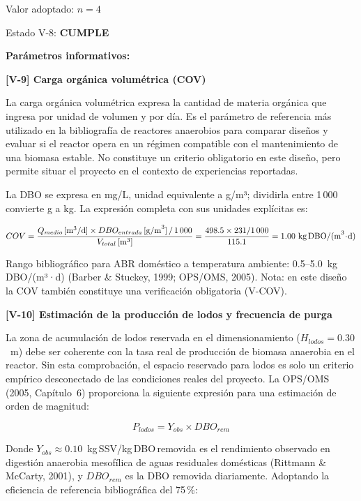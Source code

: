 \documentclass[12pt,a4paper]{article}
\begin{document}
Valor adoptado: $n = 4$

Estado V-8: \textbf{CUMPLE}

\textbf{Parámetros informativos:}

\textbf{[V-9] Carga orgánica volumétrica (COV)}

La carga orgánica volumétrica expresa la cantidad de materia orgánica que ingresa por unidad de volumen y por día. Es el parámetro de referencia más utilizado en la bibliografía de reactores anaerobios para comparar diseños y evaluar si el reactor opera en un régimen compatible con el mantenimiento de una biomasa estable. No constituye un criterio obligatorio en este diseño, pero permite situar el proyecto en el contexto de experiencias reportadas.

La DBO se expresa en mg/L, unidad equivalente a g/m³; dividirla entre 1\,000 convierte g a kg. La expresión completa con sus unidades explícitas es:

\begin{equation}
COV = \frac{Q_{medio} \,[\text{m}^3/\text{d}] \times DBO_{entrada} \,[\text{g/m}^3] \,/\, 1\,000}{V_{total} \,[\text{m}^3]} = \frac{498.5 \times 231 / 1\,000}{115.1} = 1.00 \text{ kg\,DBO/(m}^3\!\cdot\!\text{d)}
\end{equation}

Rango bibliográfico para ABR doméstico a temperatura ambiente: 0.5--5.0~kg\,DBO/(m³·d) (Barber \& Stuckey, 1999; OPS/OMS, 2005). Nota: en este diseño la COV también constituye una verificación obligatoria (V-COV).

\textbf{[V-10] Estimación de la producción de lodos y frecuencia de purga}

La zona de acumulación de lodos reservada en el dimensionamiento ($H_{lodos} = 0.30$~m) debe ser coherente con la tasa real de producción de biomasa anaerobia en el reactor. Sin esta comprobación, el espacio reservado para lodos es solo un criterio empírico desconectado de las condiciones reales del proyecto. La OPS/OMS (2005, Capítulo~6) proporciona la siguiente expresión para una estimación de orden de magnitud:

\begin{equation}
P_{lodos} = Y_{obs} \times DBO_{rem}
\end{equation}

Donde $Y_{obs} \approx 0.10$~kg\,SSV/kg\,DBO\,removida es el rendimiento observado en digestión anaerobia mesofílica de aguas residuales domésticas (Rittmann \& McCarty, 2001), y $DBO_{rem}$ es la DBO removida diariamente. Adoptando la eficiencia de referencia bibliográfica del 75\,\%:
\end{document}

